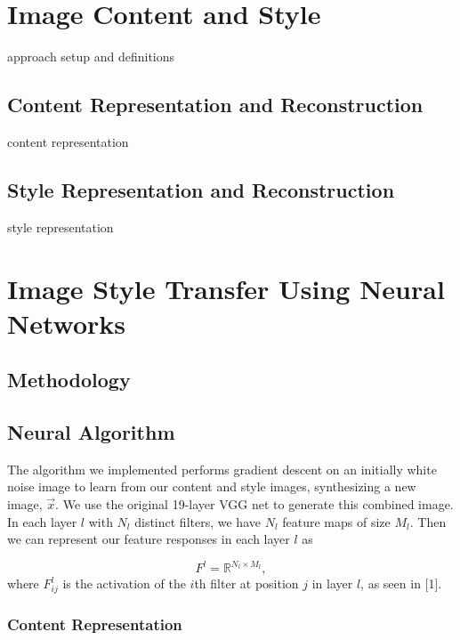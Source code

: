 \documentclass[10pt,twocolumn,letterpaper]{article}
\begin{document}
\section{Image Content and Style}

approach setup and definitions

\subsection{Content Representation and Reconstruction}

content representation

\subsection{Style Representation and Reconstruction}

style representation

\section{Image Style Transfer Using Neural Networks}

\subsection{Methodology}

\subsection{Neural Algorithm}

The algorithm we implemented performs gradient descent on an initially white noise image to learn from our content and style images, synthesizing a new image, $\vec{x}$. We use the original 19-layer VGG net to generate this combined image. In each layer $l$ with $N_l$ distinct filters, we have $N_l$ feature maps of size $M_l$. Then we can represent our feature responses in each layer $l$ as

\[ F^l = \mathbb{R}^{N_l \times M_l} , \]
where $F_{ij}^l$ is the activation of the $i$th filter at position $j$ in layer $l$, as seen in [1].
\newline

\subsubsection{Content Representation}
\end{document}
